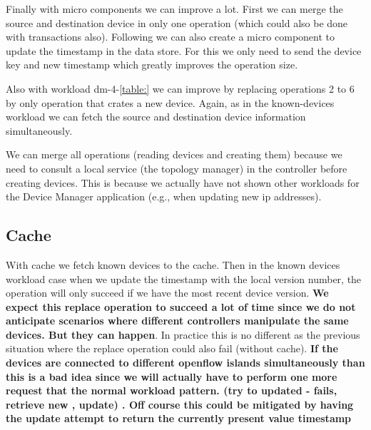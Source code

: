 \documentclass[12pt,openright,twoside]{report}
\begin{document}
Finally with micro components we can improve a lot. First we can
merge the source and destination device in only one operation (which
could also be done with transactions also). Following we can also
create a micro component to update the timestamp in the data
store. For this we only need to send the device key and new
timestamp which greatly improves the operation size.  

Also with workload dm-4-\ref{table:} we can improve by replacing
operations 2 to 6 by only operation that crates a new device. Again,
as in the known-devices workload we can fetch the source and
destination device information simultaneously. 

We can merge all operations (reading devices and creating them)
because we need to consult a local service (the topology manager) in
the controller before creating devices.  This is because we actually
have not shown other workloads for the Device Manager application
(e.g., when updating new \gls{ip} addresses). 



\subsection{Cache}
With cache we fetch known devices to the cache. Then in the known
devices workload case when we update the timestamp with the local version
number, the operation will only succeed if we have the most recent
device version.  \textbf{We expect this replace operation to succeed a lot of
time since we do not anticipate scenarios where different controllers
manipulate the same devices. But they can happen}. In practice this is
no different as the previous situation where the replace operation
could also fail (without cache). \textbf{If the devices are connected to different openflow
islands simultaneously than this is a bad idea since we will actually
have to perform one more request that the normal workload
pattern. (try to updated - fails, retrieve new , update) . Off course
this could be mitigated by having the update attempt to return the
currently present value timestamp}




\end{document}
